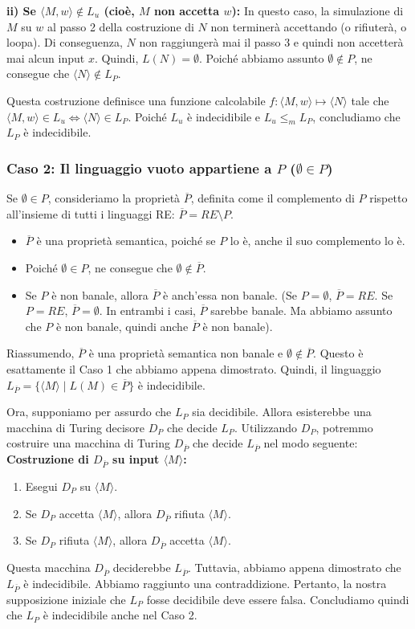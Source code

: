 \documentclass[a4paper]{article}
\theoremstyle{definition} %
\begin{document}
\textbf{ii) Se $\langle M,w \rangle \notin L_u$ (cioè, $M$ non accetta $w$):}
In questo caso, la simulazione di $M$ su $w$ al passo 2 della costruzione di $N$ non terminerà accettando (o rifiuterà, o loopa). Di conseguenza, $N$ non raggiungerà mai il passo 3 e quindi non accetterà mai alcun input $x$.
Quindi, $L(N) = \emptyset$.
Poiché abbiamo assunto $\emptyset \notin P$, ne consegue che $\langle N \rangle \notin L_P$.

Questa costruzione definisce una funzione calcolabile $f: \langle M,w \rangle \mapsto \langle N \rangle$ tale che $\langle M,w \rangle \in L_u \iff \langle N \rangle \in L_P$. Poiché $L_u$ è indecidibile e $L_u \le_m L_P$, concludiamo che $L_P$ è indecidibile.

\subsubsection{Caso 2: Il linguaggio vuoto appartiene a $P$ ($\emptyset \in P$)}
Se $\emptyset \in P$, consideriamo la proprietà $\overline{P}$, definita come il complemento di $P$ rispetto all'insieme di tutti i linguaggi RE: $\overline{P} = RE \setminus P$.
\begin{itemize}
    \item $\overline{P}$ è una proprietà semantica, poiché se $P$ lo è, anche il suo complemento lo è.
    \item Poiché $\emptyset \in P$, ne consegue che $\emptyset \notin \overline{P}$.
    \item Se $P$ è non banale, allora $\overline{P}$ è anch'essa non banale. (Se $P = \emptyset$, $\overline{P} = RE$. Se $P = RE$, $\overline{P} = \emptyset$. In entrambi i casi, $\overline{P}$ sarebbe banale. Ma abbiamo assunto che $P$ è non banale, quindi anche $\overline{P}$ è non banale).
\end{itemize}
Riassumendo, $\overline{P}$ è una proprietà semantica non banale e $\emptyset \notin \overline{P}$. Questo è esattamente il Caso 1 che abbiamo appena dimostrato. Quindi, il linguaggio $L_{\overline{P}} = \{\langle M \rangle \mid L(M) \in \overline{P}\}$ è indecidibile.

Ora, supponiamo per assurdo che $L_P$ sia decidibile. Allora esisterebbe una macchina di Turing decisore $D_P$ che decide $L_P$.
Utilizzando $D_P$, potremmo costruire una macchina di Turing $D_{\overline{P}}$ che decide $L_{\overline{P}}$ nel modo seguente:
\textbf{Costruzione di $D_{\overline{P}}$ su input $\langle M \rangle$:}
\begin{enumerate}
    \item Esegui $D_P$ su $\langle M \rangle$.
    \item Se $D_P$ accetta $\langle M \rangle$, allora $D_{\overline{P}}$ rifiuta $\langle M \rangle$.
    \item Se $D_P$ rifiuta $\langle M \rangle$, allora $D_{\overline{P}}$ accetta $\langle M \rangle$.
\end{enumerate}
Questa macchina $D_{\overline{P}}$ deciderebbe $L_{\overline{P}}$. Tuttavia, abbiamo appena dimostrato che $L_{\overline{P}}$ è indecidibile. Abbiamo raggiunto una contraddizione.
Pertanto, la nostra supposizione iniziale che $L_P$ fosse decidibile deve essere falsa. Concludiamo quindi che $L_P$ è indecidibile anche nel Caso 2.
\end{document}
